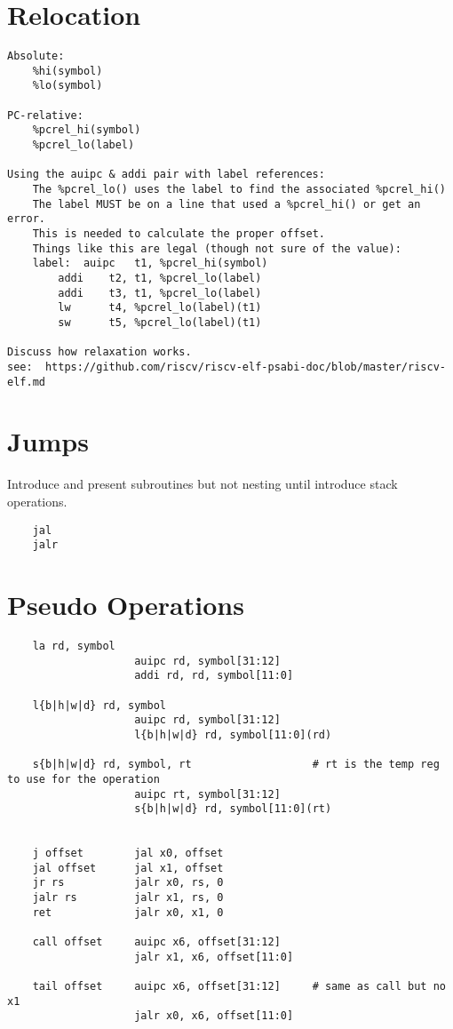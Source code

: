 \section{Relocation}

\begin{verbatim}
Absolute:
    %hi(symbol)         
    %lo(symbol)         

PC-relative:
    %pcrel_hi(symbol)   
    %pcrel_lo(label)    

Using the auipc & addi pair with label references:
    The %pcrel_lo() uses the label to find the associated %pcrel_hi()
    The label MUST be on a line that used a %pcrel_hi() or get an error.
    This is needed to calculate the proper offset.
    Things like this are legal (though not sure of the value):
    label:  auipc   t1, %pcrel_hi(symbol)
        addi    t2, t1, %pcrel_lo(label)
        addi    t3, t1, %pcrel_lo(label)
        lw      t4, %pcrel_lo(label)(t1)
        sw      t5, %pcrel_lo(label)(t1)

Discuss how relaxation works.
see:  https://github.com/riscv/riscv-elf-psabi-doc/blob/master/riscv-elf.md
\end{verbatim}


\section{Jumps}

Introduce and present subroutines but not nesting until introduce stack operations.

\label{insn:jal}
\label{insn:jalr}
\begin{verbatim}
    jal
    jalr
\end{verbatim}



\section{Pseudo Operations}

%
\begin{verbatim}
    la rd, symbol
                    auipc rd, symbol[31:12]
                    addi rd, rd, symbol[11:0]

    l{b|h|w|d} rd, symbol
                    auipc rd, symbol[31:12]
                    l{b|h|w|d} rd, symbol[11:0](rd)

    s{b|h|w|d} rd, symbol, rt                   # rt is the temp reg to use for the operation
                    auipc rt, symbol[31:12]
                    s{b|h|w|d} rd, symbol[11:0](rt)


    j offset        jal x0, offset
    jal offset      jal x1, offset
    jr rs           jalr x0, rs, 0
    jalr rs         jalr x1, rs, 0
    ret             jalr x0, x1, 0

    call offset     auipc x6, offset[31:12]
                    jalr x1, x6, offset[11:0]

    tail offset     auipc x6, offset[31:12]     # same as call but no x1
                    jalr x0, x6, offset[11:0]
\end{verbatim}


